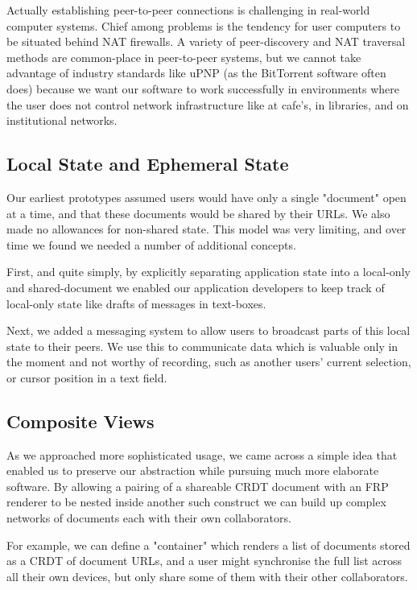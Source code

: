 \documentclass[sigplan,10pt]{acmart}
\begin{document}
Actually establishing peer-to-peer connections is challenging in real-world computer systems. Chief among problems is the tendency for user computers to be situated behind NAT firewalls. A variety of peer-discovery and NAT traversal methods are common-place in peer-to-peer systems, but we cannot take advantage of industry standards like uPNP (as the BitTorrent software often does) because we want our software to work successfully in environments where the user does not control network infrastructure like at cafe's, in libraries, and on institutional networks.


\subsection{Local State and Ephemeral State}

Our earliest prototypes assumed users would have only a single "document" open at a time, and that these documents would be shared by their URLs. We also made no allowances for non-shared state. This model was very limiting, and over time we found we needed a number of additional concepts.

First, and quite simply, by explicitly separating application state into a local-only and shared-document we enabled our application developers to keep track of local-only state like drafts of messages in text-boxes.

Next, we added a messaging system to allow users to broadcast parts of this local state to their peers. We use this to communicate data which is valuable only in the moment and not worthy of recording, such as another users' current selection, or cursor position in a text field.

\subsection{Composite Views}

As we approached more sophisticated usage, we came across a simple idea that enabled us to preserve our abstraction while pursuing much more elaborate software. By allowing a pairing of a shareable CRDT document with an FRP renderer to be nested inside another such construct we can build up complex networks of documents each with their own collaborators.

For example, we can define a "container" which renders a list of documents stored as a CRDT of document URLs, and a user might synchronise the full list across all their own devices, but only share some of them with their other collaborators.
\end{document}
